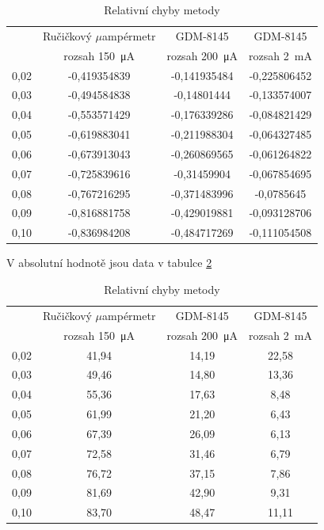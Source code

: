 \documentclass[a4paper,12pt]{article}   %
\newcommand{\tmu}{$\mu$}
\begin{document}
\begin{table}[h!]
    \centering
    \begin{tabular}{|c|c|c|c|}
        \hline
        \rule{0pt}{2.5ex}
        \multirow{2}{*}{Napětí na děliči} &Ručičkový \tmu ampérmetr	&GDM-8145 	&GDM-8145 \\[.7ex]
        & rozsah  150~μA & rozsah 200~μA & rozsah  2~mA \\\hline\hline
        0,02&-0,419354839&-0,141935484&-0,225806452 \\\hline
        0,03&-0,494584838&-0,14801444&-0,133574007  \\\hline
        0,04&-0,553571429&-0,176339286&-0,084821429 \\\hline
        0,05&-0,619883041&-0,211988304&-0,064327485 \\\hline
        0,06&-0,673913043&-0,260869565&-0,061264822 \\\hline
        0,07&-0,725839616&-0,31459904&-0,067854695  \\\hline
        0,08&-0,767216295&-0,371483996&-0,0785645   \\\hline
        0,09&-0,816881758&-0,429019881&-0,093128706 \\\hline
        0,10&-0,836984208&-0,484717269&-0,111054508  \\\hline
    \end{tabular}
    \caption{Relativní chyby metody}
    \label{tab:rel}
\end{table}
V absolutní hodnotě jsou data v tabulce \ref{tab:rel_percent}
\begin{table}[h!]
    \centering
    \begin{tabular}{|c|c|c|c|}
        \hline
        \rule{0pt}{2.5ex}
        \multirow{2}{*}{Napětí na děliči} &Ručičkový \tmu ampérmetr	&GDM-8145 	&GDM-8145 \\[.7ex]
        & rozsah  150~μA & rozsah 200~μA & rozsah  2~mA \\\hline\hline
        0,02&41,94&14,19&22,58  \\\hline
        0,03&49,46&14,80&13,36  \\\hline
        0,04&55,36&17,63&8,48   \\\hline
        0,05&61,99&21,20&6,43   \\\hline
        0,06&67,39&26,09&6,13   \\\hline
        0,07&72,58&31,46&6,79   \\\hline
        0,08&76,72&37,15&7,86   \\\hline
        0,09&81,69&42,90&9,31   \\\hline
        0,10&83,70&48,47&11,11  \\\hline
    \end{tabular}
    \caption{Relativní chyby metody}
    \label{tab:rel_percent}
\end{table}
\end{document}
